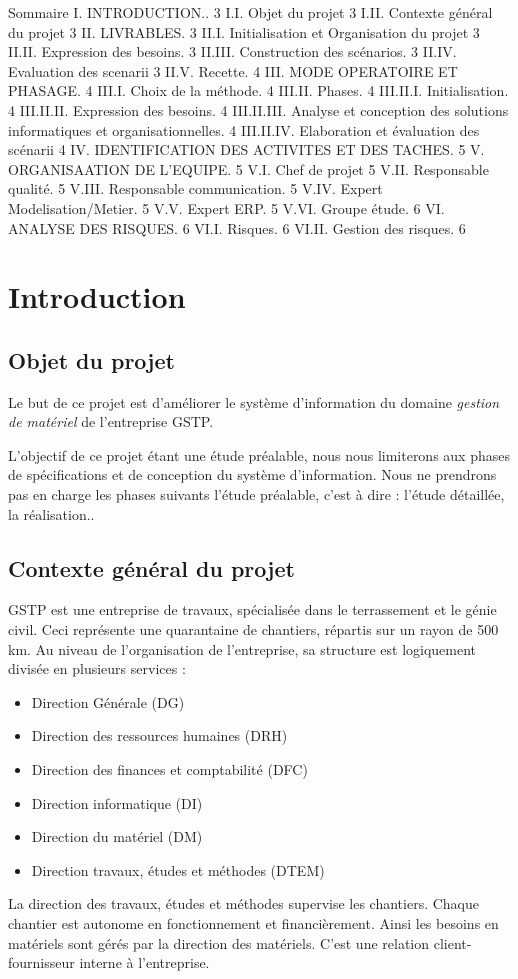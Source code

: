 Sommaire
I.       INTRODUCTION.. 3
I.I. Objet du projet 3
I.II. Contexte général du projet 3
II.      LIVRABLES. 3
II.I. Initialisation et Organisation du projet 3
II.II. Expression des besoins. 3
II.III. Construction des scénarios. 3
II.IV. Evaluation des scenarii 3
II.V. Recette. 4
III.           MODE OPERATOIRE ET PHASAGE. 4
III.I. Choix de la méthode. 4
III.II. Phases. 4
III.II.I. Initialisation. 4
III.II.II. Expression des besoins. 4
III.II.III. Analyse et conception des solutions informatiques et   organisationnelles. 4
III.II.IV. Elaboration et évaluation des scénarii 4
IV.          IDENTIFICATION DES ACTIVITES ET DES TACHES. 5
V.      ORGANISAATION DE L’EQUIPE. 5
V.I. Chef de projet 5
V.II. Responsable qualité. 5
V.III. Responsable communication. 5
V.IV. Expert Modelisation/Metier. 5
V.V. Expert ERP. 5
V.VI. Groupe étude. 6
VI.          ANALYSE DES RISQUES. 6
VI.I. Risques. 6
VI.II. Gestion des risques. 6


\section{Introduction}

\subsection{Objet du projet}

Le but de ce projet est d’améliorer le système d’information du domaine \emph{gestion de matériel} de l’entreprise GSTP.

L’objectif de ce projet étant une étude préalable, nous nous limiterons aux phases de spécifications et de conception du système d’information. Nous ne prendrons pas en charge les phases suivants l’étude préalable, c’est à dire : l’étude détaillée, la réalisation..

\subsection{Contexte général du projet}
GSTP est une entreprise de travaux, spécialisée dans le terrassement et le génie civil.
Ceci représente une quarantaine de chantiers, répartis sur un rayon de 500 km.
Au niveau de l’organisation de l’entreprise, sa structure est logiquement divisée en plusieurs services :
\begin{itemize}
    \item Direction Générale (DG)
    \item Direction des ressources humaines (DRH)
    \item Direction des finances et comptabilité (DFC)
    \item Direction informatique (DI)
    \item Direction du matériel (DM)
    \item Direction travaux, études et méthodes (DTEM)
\end{itemize}
La direction des travaux, études et méthodes supervise les chantiers. Chaque chantier est autonome en fonctionnement et financièrement. Ainsi les besoins en matériels sont gérés par la direction des matériels. C’est une relation client-fournisseur interne à l’entreprise.


